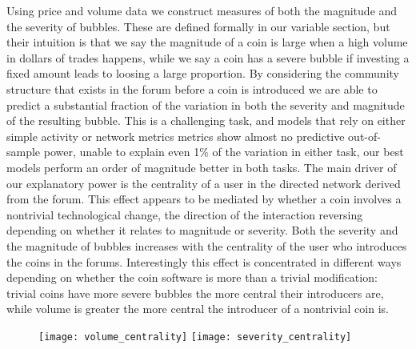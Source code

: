 Using price and volume data we construct measures of both the magnitude and the severity of bubbles.
These are defined formally in our variable section,
but their intuition is that we say the magnitude of a coin is large when a high volume in dollars of trades happens,
while we say a coin has a severe bubble if investing a fixed amount leads to loosing a large proportion. 
By considering the community structure that exists in the forum before a coin is introduced we are able to predict a substantial fraction of the variation in both the severity and magnitude of the resulting bubble.
This is a challenging task, and models that rely on either simple activity or network metrics metrics show almost no predictive out-of-sample power, unable to explain even 1\% of the variation in either task,
our best models perform an order of magnitude better in both tasks.
The main driver of our explanatory power is the centrality of a user in the directed network derived from the forum. 
This effect appears to be mediated by whether a coin involves a nontrivial technological change, the direction of the interaction reversing depending on whether it relates to magnitude or severity.
Both the severity and the magnitude of bubbles increases with the centrality of the user who introduces the coins in the forums.  
Interestingly this effect is concentrated in different ways depending on whether the coin software is more than a trivial modification: trivial coins have more severe bubbles the more central their introducers are, while volume is greater the more central the introducer of a nontrivial coin is.





\begin{figure}
\texttt{[image: volume\_centrality]}
\texttt{[image: severity\_centrality]}
\end{figure}


